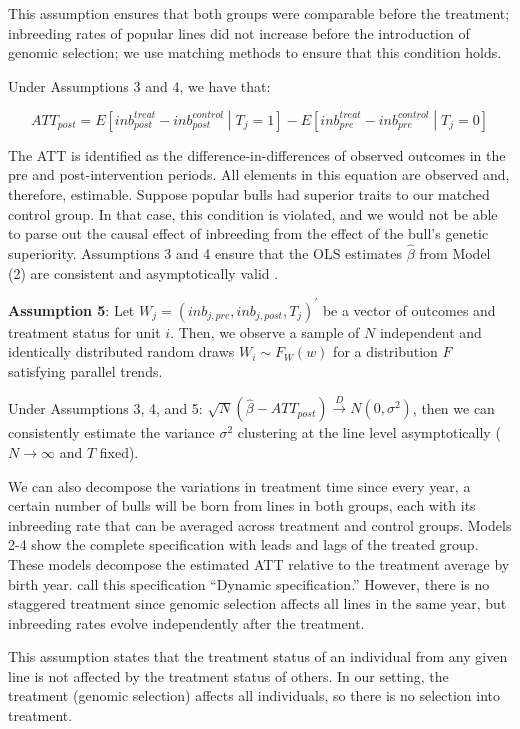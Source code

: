 \documentclass[12pt,letterpaper]{article}
\begin{document}
This assumption ensures that both groups were comparable before the treatment; inbreeding rates of popular lines did not increase before the introduction of genomic selection; we use matching methods to ensure that this condition holds. 

Under Assumptions 3 and 4, we have that:

\begin{equation}
    ATT_{post}=E\left[inb_{post}^{treat}-inb_{post}^{control} \middle| T_{j}=1\right]-E\left[inb_{pre}^{treat}-inb_{pre}^{control} \middle| T_{j}=0\right]
\end{equation}

The ATT is identified as the difference-in-differences of observed outcomes in the pre and post-intervention periods. All elements in this equation are observed and, therefore, estimable. Suppose popular bulls had superior traits to our matched control group. In that case, this condition is violated, and we would not be able to parse out the causal effect of inbreeding from the effect of the bull's genetic superiority. Assumptions 3 and 4 ensure that the OLS estimates $\hat{\beta}$ from Model (2) are consistent and asymptotically valid \citep{Roth2023}.

\medskip
\textbf{Assumption 5}: Let $W_{j}=(inb_{j,pre}, inb_{j,post}, T_{j})^{'}$ be a vector of outcomes and treatment status for unit $i$. Then, we observe a sample of $N$  independent and identically distributed random draws $W_{i}\sim F_{W}(w)$ for a distribution $F$ satisfying parallel trends.

Under Assumptions 3, 4, and 5: $\sqrt{N}(\hat{\beta}-ATT_{post})\overset{D}{\rightarrow} N(0, \sigma^{2})$, then we can consistently estimate the variance $\sigma^{2}$ clustering at the line level \citep{Bertrand2004} asymptotically ($N\rightarrow\infty$ and $T$ fixed).

We can also decompose the variations in treatment time since every year, a certain number of bulls will be born from lines in both groups, each with its inbreeding rate that can be averaged across treatment and control groups. Models 2-4 show the complete specification with leads and lags of the treated group. These models decompose the estimated ATT relative to the treatment average by birth year. \cite{Sun2021} call this specification ``Dynamic specification.'' However, there is no staggered treatment since genomic selection affects all lines in the same year, but inbreeding rates evolve independently after the treatment. 

This assumption states that the treatment status of an individual from any given line is not affected by the treatment status of others. In our setting, the treatment (genomic selection) affects all individuals, so there is no selection into treatment.
\end{document}
